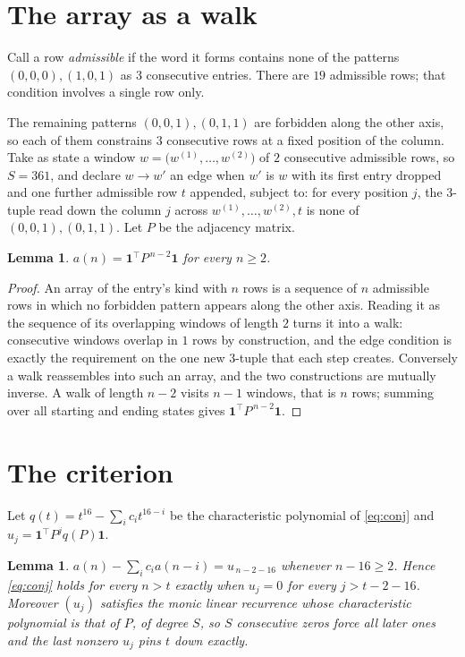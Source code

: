 \documentclass[11pt,a4paper]{article}
\theoremstyle{plain}
\newtheorem{lemma}[theorem]{Lemma}
\theoremstyle{definition}
\begin{document}
\section{The array as a walk}

Call a row \emph{admissible} if the word it forms contains none of the patterns
$(0,0,0), (1,0,1)$ as $3$ consecutive entries. There are $19$ admissible rows; that condition
involves a single row only.

The remaining patterns $(0,0,1), (0,1,1)$ are forbidden along the other axis, so each of them
constrains $3$ consecutive rows at a fixed position of the column. Take as state a
window $w=\bigl(w^{(1)},\dots,w^{(2)}\bigr)$ of $2$ consecutive admissible
rows, so $S=361$, and declare $w\to w'$ an edge when $w'$ is $w$ with its first entry
dropped and one further admissible row $t$ appended, subject to: for every position
$j$, the $3$-tuple read down the column $j$ across $w^{(1)},\dots,w^{(2)},t$
is none of $(0,0,1), (0,1,1)$. Let $P$ be the adjacency matrix.

\begin{lemma}\label{lem:walk}
$a(n)=\mathbf{1}^{\!\top}P^{\,n-2}\mathbf{1}$ for every $n\ge2$.
\end{lemma}

\begin{proof}
An array of the entry's kind with $n$ rows is a sequence of $n$ admissible rows in
which no forbidden pattern appears along the other axis. Reading it as the sequence of its
overlapping windows of length $2$ turns it into a walk: consecutive windows overlap in
$1$ rows by construction, and the edge condition is exactly the requirement on the one
new $3$-tuple that each step creates. Conversely a walk reassembles into such an array,
and the two constructions are mutually inverse. A walk of length $n-2$ visits $n-1$
windows, that is $n$ rows; summing over all starting and ending states gives
$\mathbf{1}^{\!\top}P^{\,n-2}\mathbf{1}$.
\end{proof}

\section{The criterion}

Let $q(t)=t^{16}-\sum_i c_i t^{16-i}$ be the characteristic polynomial of
\eqref{eq:conj} and $u_j=\mathbf{1}^{\!\top}P^{j}q(P)\mathbf{1}$.

\begin{lemma}\label{lem:crit}
$a(n)-\sum_i c_i a(n-i)=u_{\,n-2-16}$ whenever $n-16\ge2$. Hence
\eqref{eq:conj} holds for every $n>t$ exactly when $u_j=0$ for every
$j>t-2-16$. Moreover $(u_j)$ satisfies the monic linear recurrence whose
characteristic polynomial is that of $P$, of degree $S$, so $S$ consecutive zeros force all
later ones and the last nonzero $u_j$ pins $t$ down exactly.
\end{lemma}
\end{document}
